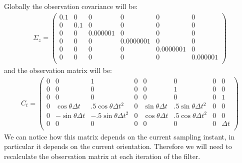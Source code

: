 Globally the observation covariance will be:
\begin{align}
	\Sigma_z = \begin{pmatrix}
				0.1 & 0 & 0 & 0 & 0 & 0\\
				0 & 0.1 & 0 & 0 & 0 & 0\\
				0 & 0 & 0.000001 & 0 & 0 & 0\\
				0 & 0 & 0 & 0.0000001 & 0 & 0\\
				0 & 0 & 0 & 0 & 0.0000001 & 0\\
				0 & 0 & 0 & 0 & 0 & 0.000001\\
			\end{pmatrix}
\end{align}
and the observation matrix will be:
\begin{align}
	C_t = \begin{pmatrix}
				0 & 0 & 1 & 0 & 0 & 0 & 0 & 0\\
				0 & 0 & 0 & 0 & 0 & 1 & 0 & 0\\
				0 & 0 & 0 & 0 & 0 & 0 & 0 & 1\\
				0 & \cos\theta \Delta t & .5 \cos\theta \Delta t^2 & 0 & \sin\theta \Delta t & .5 \sin\theta \Delta t^2 & 0 & 0\\
				0 & -\sin\theta \Delta t & -.5 \sin\theta \Delta t^2 & 0 & \cos\theta \Delta t & .5 \cos\theta \Delta t^2 & 0 & 0\\
				0 & 0 & 0 & 0 & 0 & 0 & 0 & \Delta t\\
			\end{pmatrix}
\end{align}
We can notice how this matrix depends on the current sampling instant, in particular it depends on the current orientation. Therefore we will need to recalculate the observation matrix at each iteration of the filter.
